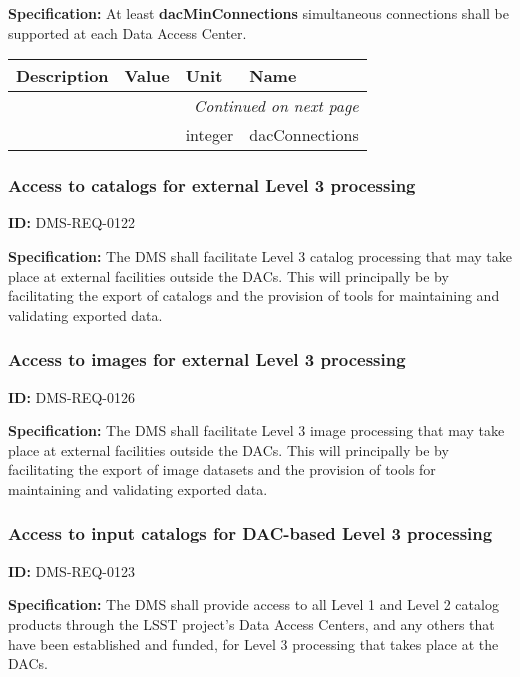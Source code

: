 \documentclass[SE,toc,lsstdraft]{lsstdoc}
\makeatletter
\newcommand{\paramname}[1]{\hspace{0pt}#1}
\newcommand{\unitname}[1]{\hspace{0pt}#1}
\newenvironment{parameters}[0]{%
\setlength\LTleft{0pt}
\setlength\LTright{\fill}
\begin{small}
\begin{longtable}[]{|p{0.5\textwidth}|l|p{0.6in}|p{1.74in}@{}|}

\hline \textbf{Description} & \textbf{Value} & \textbf{Unit} & \textbf{Name} \\ \hline
\endhead

\hline \multicolumn{4}{r}{\emph{Continued on next page}} \\
\endfoot

\hline\hline
\endlastfoot
}{%
\hline
\end{longtable}
\end{small}
}
\makeatother
\begin{document}
\textbf{Specification:} At least \textbf{dacMinConnections }simultaneous connections shall be supported at each Data Access Center.





\begin{parameters}

&

&
\unitname{%
integer
}
&
\paramname{%
dacConnections
} \\\hline
\end{parameters}




\subsubsection{Access to catalogs for external Level 3 processing}

\label{DMS-REQ-0122}
\textbf{ID:} DMS-REQ-0122

\textbf{Specification: }The DMS shall facilitate Level 3 catalog processing that may take place at external facilities outside the DACs.  This will principally be by facilitating the export of catalogs and the provision of tools for maintaining and validating exported data.






\subsubsection{Access to images for external Level 3 processing}

\label{DMS-REQ-0126}
\textbf{ID:} DMS-REQ-0126

\textbf{Specification: }The DMS shall facilitate Level 3 image processing that may take place at external facilities outside the DACs.  This will principally be by facilitating the export of image datasets and the provision of tools for maintaining and validating exported data.






\subsubsection{Access to input catalogs for DAC-based Level 3 processing}

\label{DMS-REQ-0123}
\textbf{ID:} DMS-REQ-0123

\textbf{Specification: }The DMS shall provide access to all Level 1 and Level 2 catalog products through the LSST project's Data Access Centers, and any others that have been established and funded, for Level 3 processing that takes place at the DACs.
\end{document}
